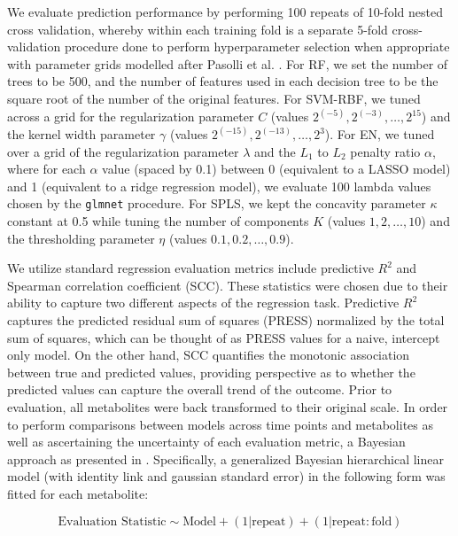 We evaluate prediction performance by performing 100 repeats of 10-fold nested cross validation, whereby within each training fold is a separate 5-fold cross-validation procedure done to perform hyperparameter selection when appropriate with parameter grids modelled after Pasolli et al. \cite{pasolli2016machine}. For RF, we set the number of trees to be 500, and the number of features used in each decision tree to be the square root of the number of the original features. For SVM-RBF, we tuned across a grid for the regularization parameter $C$ (values $2^{(-5)},2^{(-3)},\ldots,2^{15}$) and the kernel width parameter $\gamma$ (values $2^{(-15)},2^{(-13)},\ldots,2^{3}$). For EN, we tuned over a grid of the regularization parameter $\lambda$ and the $L_1$ to $L_2$ penalty ratio $\alpha$, where for each $\alpha$ value (spaced by 0.1) between 0 (equivalent to a LASSO model) and 1 (equivalent to a ridge regression model), we evaluate 100 lambda values chosen by the \texttt{glmnet} procedure. For SPLS, we kept the concavity parameter $\kappa$ constant at 0.5 while tuning the number of components $K$ (values $1,2,\ldots,10$) and the thresholding parameter $\eta$ (values $0.1,0.2,\ldots,0.9$). 

We utilize standard regression evaluation metrics include predictive $R^2$ and Spearman correlation coefficient (SCC). These statistics were chosen due to their ability to capture two different aspects of the regression task. Predictive $R^2$ captures the predicted residual sum of squares (PRESS) normalized by the total sum of squares, which can be thought of as PRESS values for a naive, intercept only model. On the other hand, SCC quantifies the monotonic association between true and predicted values, providing perspective as to  whether the predicted values can capture the overall trend of the outcome. Prior to evaluation, all metabolites were back transformed to their original scale. In order to perform comparisons between models across time points and metabolites as well as ascertaining the uncertainty of each evaluation metric, a Bayesian approach as presented in \cite{benavoli2017time}. Specifically, a generalized Bayesian hierarchical linear model (with identity link and gaussian standard error) in the following form was fitted for each metabolite:

$$
\text{Evaluation Statistic} \sim \text{Model} + (1 | \text{repeat})+(1 | \text{repeat}:\text{fold})
$$


